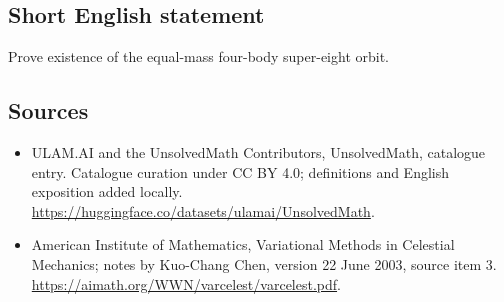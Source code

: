 \documentclass[11pt]{article}
\begin{document}
\subsection{Short English statement}
Prove existence of the equal-mass four-body super-eight orbit.
\subsection{Sources}
\begin{itemize}
\item[\hypertarget{source:statement:1}{S1}] ULAM.AI and the UnsolvedMath Contributors, UnsolvedMath, catalogue entry. Catalogue curation under CC BY 4.0; definitions and English exposition added locally.
\url{https://huggingface.co/datasets/ulamai/UnsolvedMath}.
\item[\hypertarget{source:statement:2}{S2}] American Institute of Mathematics, Variational Methods in Celestial Mechanics; notes by Kuo-Chang Chen, version 22 June 2003, source item 3.
\url{https://aimath.org/WWN/varcelest/varcelest.pdf}.
\end{itemize}
\label{end:statement}
\end{document}
